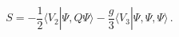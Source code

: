 \begin{equation}
S = -\frac{1}{2}\langle V_2 | \Psi, Q \Psi \rangle
-\frac{g}{3}   \langle V_3 | \Psi, \Psi, \Psi \rangle\,.
\label{eq:action-Fock}
\end{equation}

